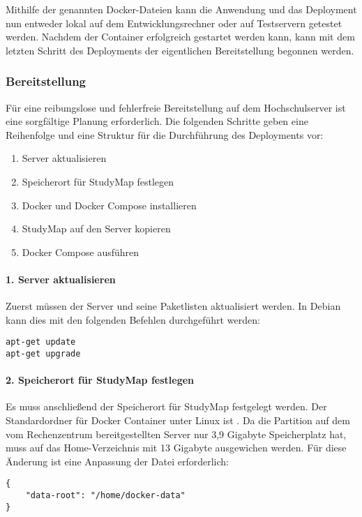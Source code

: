 Mithilfe der genannten Docker-Dateien kann die Anwendung und das Deployment nun entweder lokal auf dem Entwicklungsrechner oder auf Testservern getestet werden. Nachdem der Container erfolgreich gestartet werden kann, kann mit dem letzten Schritt des Deployments der eigentlichen Bereitstellung begonnen werden.

\subsubsection{Bereitstellung}
Für eine reibungslose und fehlerfreie Bereitstellung auf dem Hochschulserver ist eine sorgfältige Planung erforderlich. Die folgenden Schritte geben eine Reihenfolge und eine Struktur für die Durchführung des Deployments vor:
\begin{enumerate}
    \item Server aktualisieren
    \item Speicherort für StudyMap festlegen
    \item Docker und Docker Compose installieren
    \item StudyMap auf den Server kopieren
    \item Docker Compose ausführen
\end{enumerate}

\paragraph*{1. Server aktualisieren}
Zuerst müssen der Server und seine Paketlisten aktualisiert werden. In Debian kann dies mit den folgenden Befehlen durchgeführt werden:
\begin{lstlisting}[style=Python]
apt-get update
apt-get upgrade
\end{lstlisting}

\paragraph*{2. Speicherort für StudyMap festlegen}
Es muss anschließend der Speicherort für StudyMap festgelegt werden. Der Standardordner für Docker Container unter Linux ist . Da die Partition auf dem vom Rechenzentrum bereitgestellten Server nur 3,9 Gigabyte Speicherplatz hat, muss auf das Home-Verzeichnis mit 13 Gigabyte ausgewichen werden. Für diese Änderung ist eine Anpassung der Datei  erforderlich:
\begin{lstlisting}[style=Python]
{
    "data-root": "/home/docker-data"
}
\end{lstlisting}

